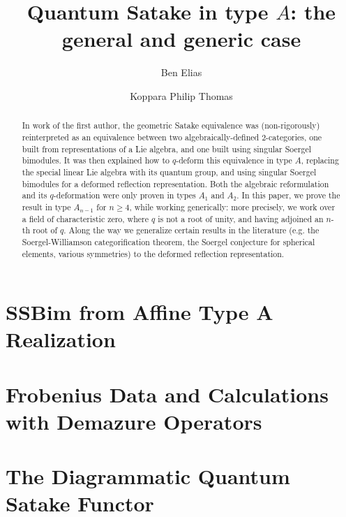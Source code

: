\documentclass[11pt,reqno]{amsart}
\title{Quantum Satake in type $A$: the general and generic case}
\author[]{Ben Elias}
\author[]{Koppara Philip Thomas}
\date{}
\theoremstyle{definition}
\numberwithin{equation}{section}
\begin{document}
\begin{abstract}
    In work of the first author, the geometric Satake equivalence was (non-rigorously) reinterpreted as an equivalence between two algebraically-defined $2$-categories, one built from representations of a Lie algebra, and one built using singular Soergel bimodules. It was then explained how to $q$-deform this equivalence in type $A$, replacing the special linear Lie algebra with its quantum group, and using singular Soergel bimodules for a deformed reflection representation. Both the algebraic reformulation and its $q$-deformation were only proven in types $A_1$ and $A_2$. In this paper, we prove the result in type $A_{n-1}$ for $n \ge 4$, while working generically: more precisely, we work over a field of characteristic zero, where $q$ is not a root of unity, and having adjoined an $n$-th root of $q$. Along the way we generalize certain results in the literature (e.g. the Soergel-Williamson categorification theorem, the Soergel conjecture for spherical elements, various symmetries) to the deformed reflection representation.
\end{abstract}
\maketitle


\section{SSBim from Affine Type A Realization}

\section{Frobenius Data and Calculations with Demazure Operators}

\section{The Diagrammatic Quantum Satake Functor}

\end{document}
